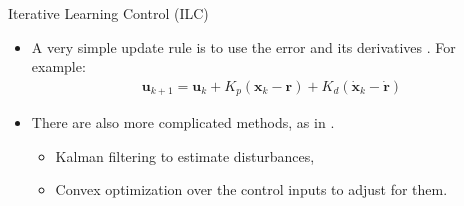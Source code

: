 \documentclass{beamer}
\newcommand{\state}{\mathbf{x}} %
\newcommand{\traj}{\mathbf{r}} %
\newcommand{\sysInput}{\mathbf{u}} %
\begin{document}
\begin{frame}{Iterative Learning Control (ILC)}
\begin{itemize}
\item A very simple update rule is to use the error and its derivatives \cite{Arimoto}. For example: \pause
\begin{equation*}
\begin{aligned}
\sysInput_{k+1} = \sysInput_{k} + K_{p}(\state_{k} - \traj) + K_{d}(\dot{\state}_{k} - \dot{\traj})
\end{aligned}
\end{equation*}
\pause
\item There are also more complicated methods, as in \cite{ILC_Angela}.
\pause
\begin{itemize}
 \item Kalman filtering to estimate disturbances, \pause
 \item Convex optimization over the control inputs to adjust for them.
\end{itemize}
\end{itemize}
\end{frame}
%
\end{document}
